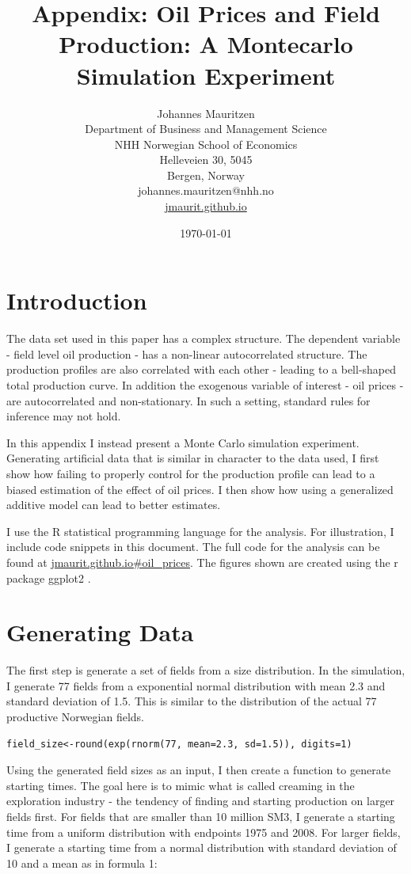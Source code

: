 \documentclass[12pt]{article}
\title{Appendix: Oil Prices and Field Production: A Montecarlo Simulation Experiment}
\author{Johannes Mauritzen\\
		Department of Business and Management Science\\
        NHH Norwegian School of Economics\\
        Helleveien 30, 5045\\
        Bergen, Norway\\
        johannes.mauritzen@nhh.no\\
        \url{jmaurit.github.io}\\
		}
\date{\today}
\begin{document}
	\maketitle


\section{Introduction}

The data set used in this paper has a complex structure.  The dependent variable - field level oil production - has a non-linear autocorrelated structure.  The production profiles are also correlated with each other - leading to a bell-shaped total production curve.  In addition the exogenous variable of interest - oil prices - are autocorrelated and non-stationary.    In such a setting, standard rules for inference may not hold. 

In this appendix I instead present a Monte Carlo simulation experiment.  Generating artificial data that is similar in character to the data used, I first show how failing to properly control for the production profile can lead to a biased estimation of the effect of oil prices.  I then show how using a generalized additive model can lead to better estimates.  

I use the R statistical programming language \citet{r_core_team_r:_2013} for the analysis.  For illustration, I include code snippets in this document.  The full code for the analysis can be found at \url{jmaurit.github.io\#oil_prices}. The figures shown are created using the r package ggplot2 \citet{wickham_ggplot2:_2009}.

\section{Generating Data} 

The first step is generate a set of fields from a size distribution.  In the simulation, I generate 77 fields from a exponential normal distribution with mean 2.3 and standard deviation of 1.5.  This is similar to the distribution of the actual 77 productive Norwegian fields. 
\begin{verbatim}
field_size<-round(exp(rnorm(77, mean=2.3, sd=1.5)), digits=1)
\end{verbatim}

Using the generated field sizes as an input, I then create a function to generate starting times.  The goal here is to mimic what is called creaming in the exploration industry - the tendency of finding and starting production on larger fields first. For fields that are smaller than 10 million SM3, I generate a starting time from a uniform distribution with endpoints 1975 and 2008.  For larger fields, I generate a starting time from a normal distribution with standard deviation of 10 and a mean as in formula 1:
\end{document}
